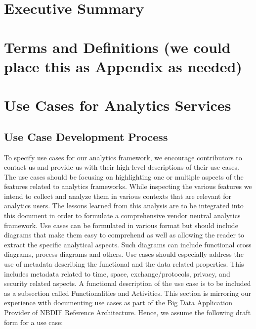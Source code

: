 \documentclass[12pt]{article}
\begin{document}

\pagenumbering{\arabic}

\section{Executive Summary}
\newpage



\section{Terms and Definitions (we could place this as Appendix as needed)}



\section{Use Cases for Analytics Services}


\subsection{Use Case Development Process}

To specify use cases for our analytics framework, we encourage contributors to contact us and provide us with their high-level descriptions of their use cases. The use cases should be focusing on highlighting one or multiple aspects of the features related to analytics frameworks. While inspecting the various features we intend to collect and analyze them in various contexts that are relevant for analytics users. The lessons learned from this analysis are to be integrated into this document in order to formulate a comprehensive vendor neutral analytics framework.
Use cases can be formulated in various format but should include diagrams that make them easy to comprehend as well as allowing the reader to extract the specific analytical aspects. Such diagrams can include functional cross diagrams, process diagrams and others.
Use cases should especially address the use of metadata describing the functional and the data related properties. This includes metadata related to time, space, exchange/protocols, privacy, and security related aspects.
A functional description of the use case is to be included as a subsection called Functionalities and Activities. This section is mirroring our experience with documenting use cases as part of the Big Data Application Provider of NBDIF Reference Architecture. Hence, we assume the following draft form for a use case:
\end{document}
